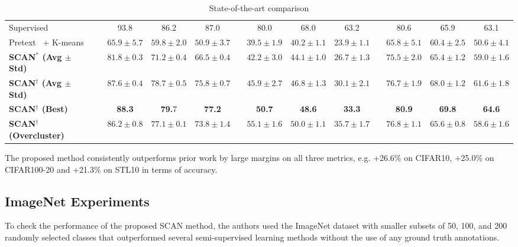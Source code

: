 \begin{table}[ht]
\begin{center}
{\begin{tabular}{@{}l c ccc c ccc c ccc@{}}
\midrule
Supervised  && 93.8 &  86.2 & 87.0   && 80.0 & 68.0 & 63.2 && 80.6 & 65.9 & 63.1\\
Pretext~\cite{chen2020simple} + K-means && $65.9\pm5.7$ & $59.8\pm2.0$ & $50.9\pm3.7$   && $39.5\pm1.9$ & $40.2\pm1.1$ & $23.9\pm1.1$ && $65.8\pm5.1$ & $60.4\pm2.5$ & $50.6\pm4.1$\\
\textbf{SCAN$^*$ (Avg $\pm$ Std) }  &&$81.8\pm0.3$ & $71.2\pm 0.4$ & $66.5\pm0.4 $&& $42.2\pm3.0$ & $44.1\pm1.0$ & $26.7\pm1.3$ && $75.5\pm2.0$ & $65.4\pm1.2$&$59.0\pm1.6$  \\
\textbf{SCAN$^\dagger$ (Avg $\pm$ Std) } &&$87.6\pm0.4$ & $78.7\pm 0.5$ & $75.8\pm0.7 $&& $45.9\pm2.7$ & $46.8\pm1.3$ & $30.1\pm2.1$ && $76.7\pm1.9$ & $68.0\pm1.2$&$61.6\pm1.8$  \\
\textbf{SCAN$^\dagger$ (Best)} && \textbf{88.3} &\textbf{79.}7 & \textbf{77.2} && \textbf{50.7} & \textbf{48.6} & \textbf{33.3} && \textbf{80.9} & \textbf{69.8} & \textbf{64.6} \\
\midrule
\textbf{SCAN$^\dagger$ (Overcluster)} &&$86.2\pm0.8$ & $77.1\pm 0.1$ & $73.8\pm1.4 $&& $55.1\pm1.6$ & $50.0\pm1.1$ & $35.7\pm1.7$ && $76.8\pm1.1$ & $65.6\pm0.8$&$58.6\pm1.6$  \\
\bottomrule
\end{tabular}
}
\end{center}

\caption{State-of-the-art comparison}
\end{table}
\setlength{\tabcolsep}{1.4pt}

\FloatBarrier
The proposed method consistently outperforms prior work by large margins on all three metrics, e.g. +26.6\% on CIFAR10, +25.0\% on CIFAR100-20 and +21.3\% on STL10 in terms of accuracy. 

\medskip


\subsection{ImageNet Experiments} 

To check the performance of the proposed SCAN method, the authors used the ImageNet dataset with smaller subsets of 50, 100, and 200 randomly selected classes that outperformed several semi-supervised learning methods without the use of any ground truth annotations. 
 

